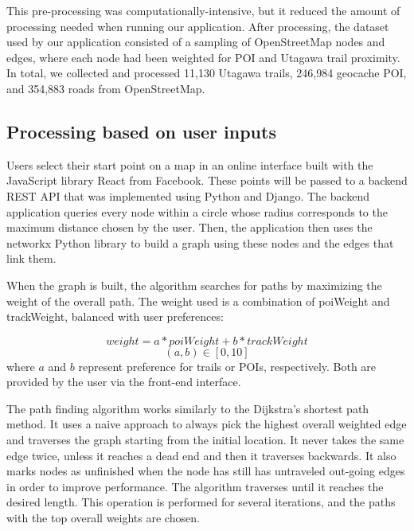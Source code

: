 \documentclass[sigconf]{acmart}
\begin{document}
This pre-processing was computationally-intensive, but it reduced the amount of processing needed when running our application. After processing, the dataset used by our application consisted of a sampling of OpenStreetMap nodes and edges, where each node had been weighted for POI and Utagawa trail proximity. In total, we collected and processed 11,130 Utagawa trails, 246,984 geocache POI, and 354,883 roads from OpenStreetMap.

\subsection{Processing based on user inputs}

Users select their start point on a map in an online interface built with the JavaScript library React from Facebook. These points will be passed to a backend REST API that was implemented using Python and Django. The backend application queries every node within a circle whose radius corresponds to the maximum distance chosen by the user. Then, the application then uses the networkx Python library to build a graph using these nodes and the edges that link them.

When the graph is built, the algorithm searches for paths by maximizing the weight of the overall path. The weight used is a combination of poiWeight and trackWeight, balanced with user preferences:

\begin{equation}
	weight = a*poiWeight + b*trackWeight
\end{equation}
\begin{equation}
	(a, b) \in [0, 10]
\end{equation}
where $a$ and $b$ represent preference for trails or POIs, respectively. Both are provided by the user via the front-end interface. 

The path finding algorithm works similarly to the Dijkstra's shortest path method. It uses a naive approach to always pick the highest overall weighted edge and traverses the graph starting from the initial location. It never takes the same edge twice, unless it reaches a dead end and then it traverses backwards. It also marks nodes as unfinished when the node has still has untraveled out-going edges in order to improve performance. The algorithm traverses until it reaches the desired length. This operation is performed for several iterations, and the paths with the top overall weights are chosen.
\end{document}
